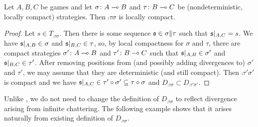 \documentclass{entcs} \usepackage{prentcsmacro}
\newcommand{\0}{{\mathtt{0}}}
\begin{document}
\begin{proposition}
  Let $A,B,C$ be games and let $\sigma\colon A\multimap B$ and $\tau\colon B\multimap C$ be (nondeterministic, locally compact) strategies.  Then $\comp\tau\sigma$ is locally compact.
\end{proposition}
  \begin{proof}
    Let $s\in T_{\comp\tau\sigma}$.  Then there is some sequence $\mathfrak s\in\sigma\|\tau$ such that $\mathfrak s\vert_{A,C}=s$.  We have $\mathfrak s\vert_{A,B}\in\sigma$ and $\mathfrak s\vert_{B,C}\in\tau$, so, by local compactness for $\sigma$ and $\tau$, there are compact strategies $\sigma'\colon A\multimap B$ and $\tau'\colon B\multimap C$ such that $\mathfrak s\vert_{A,B}\in\sigma'$ and $\mathfrak s\vert_{B,C}\in\tau'$.  After removing positions from (and possibly adding divergences to) $\sigma'$ and $\tau'$, we may assume that they are deterministic (and still compact).  Then $\comp{\tau'}{\sigma'}$ is compact and we have $\mathfrak s\vert_{A,C}\in\tau' \circ \sigma'\subseteq\tau \circ \sigma$ and $D_{\comp\tau\sigma}\subset D_{\comp{\tau'}{\sigma'}}$.
  \end{proof}

Unlike \cite{mcCHFiniteND}, we do not need to change the definition of $D_{\comp\tau\sigma}$ to reflect divergence arising from infinite chattering.  The following example shows that it arises naturally from existing definition of $D_{\comp\tau\sigma}$.
\end{document}
